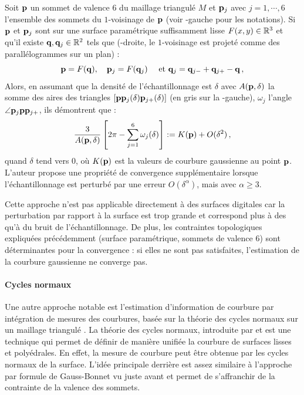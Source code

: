 Soit $\mathbf{p}$ un sommet de valence $6$ du maillage triangulé $M$ et $\mathbf{p}_j$ avec
$j = 1,\cdots, 6$ l'ensemble des sommets du $1$-voisinage de $\mathbf{p}$ (voir
-gauche pour les notations). Si $\mathbf{p}$ et $\mathbf{p}_j$
sont sur une surface paramétrique suffisamment lisse $F(x,y) \in \mathbb{R}^3$ et
qu'il existe $\mathbf{q}, \mathbf{q}_j \in \mathbb{R}^2$ tels que
(-droite, le $1$-voisinage est projeté comme des
parallélogrammes sur un plan) :
%
\begin{equation}
  \mathbf{p}=F(\mathbf{q}), \quad \mathbf{p}_j=F(\mathbf{q}_j) \quad \text{~et~} \mathbf{q}_j=\mathbf{q}_{j-} + \mathbf{q}_{j+} - \mathbf{q} \,,
\end{equation}
%
Alors, en assumant que la densité de l’échantillonnage est $\delta$ avec $A(\mathbf{p}, \delta)$ la somme des aires des triangles
$[\mathbf{p}\mathbf{p}_j(\delta)\mathbf{p}_{j+}(\delta)]$ (en gris sur la
-gauche), $\omega_j$ l'angle $\angle
\mathbf{p}_j\mathbf{p}\mathbf{p}_{j+}$, ils démontrent que :
%
\begin{equation}
  \frac{3}{A(\mathbf{p},\delta)} \left[ 2\pi - \sum \limits^6_{j=1} \omega_j(\delta) \right] := K(\mathbf{p}) + O(\delta^2) \,,
\end{equation}
%
quand $\delta$ tend vers $0$, où $K(\mathbf{p})$ est la valeurs de courbure
gaussienne au point $\mathbf{p}$.
%
%
L'auteur propose une propriété de convergence supplémentaire lorsque
l'échantillonnage est perturbé par une erreur $O(\delta^\alpha)$, mais avec
$\alpha \ge 3$.


Cette approche n'est pas applicable directement à des surfaces digitales car la
perturbation par rapport à la surface est trop grande et
correspond plus à des  qu'à du bruit de l'échantillonnage. De
plus, les contraintes topologiques expliquées précédemment (surface
paramétrique, sommets de valence $6$) sont déterminantes pour la convergence :
si elles ne sont pas satisfaites, l'estimation de la courbure gaussienne ne
converge pas.
%
\paragraph{Cycles normaux}
%
Une autre approche notable est l'estimation d'information de courbure par
intégration de mesures des courbures, basée sur la théorie des cycles normaux sur
un maillage triangulé \cite{CohenSteiner2003,CohenSteiner2006}.
%
%
La théorie des cycles normaux, introduite par  et
 est une technique qui permet de définir de manière
unifiée la courbure de surfaces lisses et polyédrales. En effet, la mesure de
courbure peut être obtenue par les cycles normaux de la surface. L'idée
principale derrière est assez similaire à l'approche par formule de Gauss-Bonnet
vu juste avant et permet de s'affranchir de la contrainte de la valence des
sommets.


